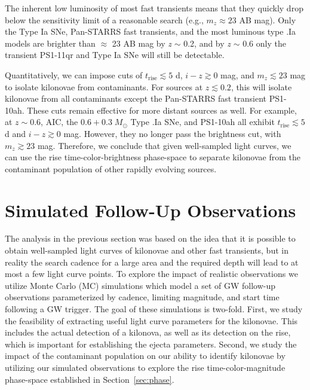 The inherent low luminosity of most fast transients means that they quickly drop below the sensitivity limit of a reasonable search (e.g., $m_z \approx 23$ AB mag). Only the Type Ia SNe, Pan-STARRS fast transients, and the most luminous type .Ia models are brighter than $\approx$ 23 AB mag by {\em z} $\sim$ 0.2, and by {\em z} $\sim$ 0.6 only the transient PS1-11qr and Type Ia SNe will still be detectable. 

Quantitatively, we can impose cuts of $t_{\text{rise}} \lesssim  5$ d, $i-z \gtrsim 0$ mag, and $m_z \lesssim 23$ mag to isolate kilonovae from contaminants. For sources at $z \lesssim 0.2$, this will isolate kilonovae from all contaminants except the Pan-STARRS fast transient PS1-10ah. These cuts remain effective for more distant sources as well. For example, at $z\sim0.6$, AIC, the $0.6+0.3\;M_{\odot}$ Type .Ia SNe, and PS1-10ah all exhibit $t_{\text{rise}} \lesssim  5$ d and $i-z \gtrsim 0$ mag. However, they no longer pass the brightness cut, with $m_z \gtrsim 23$ mag. Therefore, we conclude that given well-sampled light curves, we can use the rise time-color-brightness phase-space to separate kilonovae from the contaminant population of other rapidly evolving sources.
 
\section{Simulated Follow-Up Observations}
\label{sec:MCsims}
The analysis in the previous section was based on the idea that it is possible to obtain well-sampled light curves of kilonovae and other fast transients, but in reality the search cadence for a large area and the required depth will lead to at most a few light curve points. To explore the impact of realistic observations we utilize Monte Carlo (MC) simulations which model a set of GW follow-up observations parameterized by cadence, limiting magnitude, and start time following a GW trigger.  The goal of these simulations is two-fold. First, we study the feasibility of extracting useful light curve parameters for the kilonovae. This includes the actual detection of a kilonova, as well as its detection on the rise, which is important for establishing the ejecta parameters. Second, we study the impact of the contaminant population on our ability to identify kilonovae by utilizing our simulated observations to explore the rise time-color-magnitude phase-space established in Section~\ref{sec:phase}.

